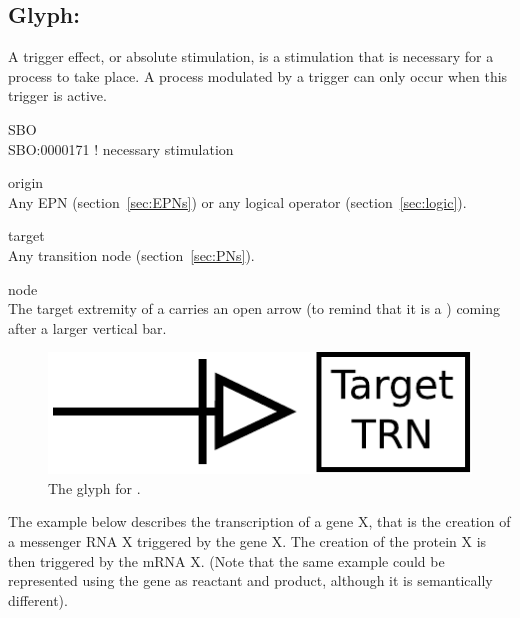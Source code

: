 
\subsection{Glyph: }\label{sec:trigger}

A trigger effect, or absolute stimulation, is a stimulation that is necessary for a process to take place. A process modulated by a trigger can only occur when this trigger is active.

\begin{glyphDescription}
 \item[SBO]\mbox{}\\ SBO:0000171 ! necessary stimulation
 \item[origin]\mbox{}\\ Any EPN (section~\ref{sec:EPNs}) or any logical operator (section~\ref{sec:logic}).
 \item[target]\mbox{}\\ Any transition node (section~\ref{sec:PNs}).
 \item[node]\mbox{}\\ The target extremity of a  carries an open arrow (to remind that it is a ) coming after a larger vertical bar.
 \end{glyphDescription}

\begin{figure}[H]
  \centering
  \includegraphics[scale = 0.5]{images/trigger}
  \caption{The \PD glyph for .}
  \label{fig:trigger}
\end{figure}

The example below describes the transcription of a gene X, that is the creation of a messenger RNA X triggered by the gene X. The creation of the protein X is then triggered by the mRNA X. (Note that the same example could be represented using the gene as reactant and product, although it is semantically different).

